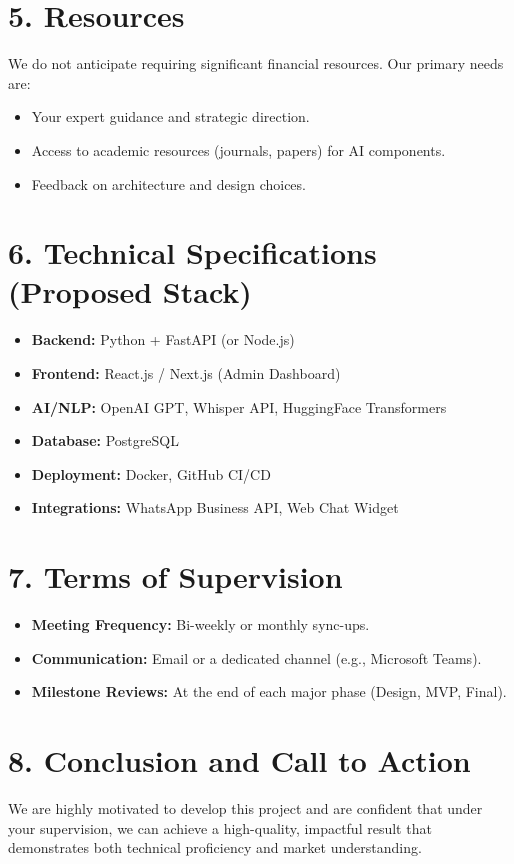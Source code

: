 \documentclass[12pt,a4paper]{article}
\begin{document}
\section*{5. Resources}
We do not anticipate requiring significant financial resources. Our primary needs are:
\begin{itemize}[leftmargin=*]
    \item Your expert guidance and strategic direction.
    \item Access to academic resources (journals, papers) for AI components.
    \item Feedback on architecture and design choices.
\end{itemize}

\section*{6. Technical Specifications (Proposed Stack)}
\begin{itemize}[leftmargin=*]
    \item \textbf{Backend:} Python + FastAPI (or Node.js) 
    \item \textbf{Frontend:} React.js / Next.js (Admin Dashboard)
    \item \textbf{AI/NLP:} OpenAI GPT, Whisper API, HuggingFace Transformers
    \item \textbf{Database:} PostgreSQL
    \item \textbf{Deployment:} Docker, GitHub CI/CD
    \item \textbf{Integrations:} WhatsApp Business API, Web Chat Widget
\end{itemize}

\section*{7. Terms of Supervision}
\begin{itemize}[leftmargin=*]
    \item \textbf{Meeting Frequency:} Bi-weekly or monthly sync-ups.
    \item \textbf{Communication:} Email or a dedicated channel (e.g., Microsoft Teams).
    \item \textbf{Milestone Reviews:} At the end of each major phase (Design, MVP, Final).
\end{itemize}

\section*{8. Conclusion and Call to Action}
We are highly motivated to develop this project and are confident that under your 
supervision, we can achieve a high-quality, impactful result that demonstrates both 
technical proficiency and market understanding.  
\end{document}
